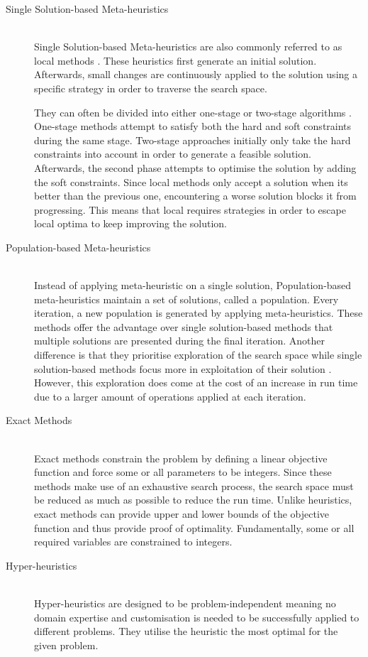 \begin{description}
\item [Single Solution-based Meta-heuristics] \hfill \\
Single Solution-based Meta-heuristics are also commonly referred to as \acrfull{local} methods \cite{lin1973}. These heuristics first generate an initial solution. Afterwards, small changes are continuously applied to the solution using a specific strategy in order to traverse the search space. 

They can often be divided into either one-stage or two-stage algorithms \cite{lewis2008}. One-stage methods attempt to satisfy both the hard and soft constraints during the same stage. Two-stage approaches initially only take the hard constraints into account in order to generate a feasible solution. Afterwards, the second phase attempts to optimise the solution by adding the soft constraints. Since \acrshort{local} methods only accept a solution when its better than the previous one, encountering a worse solution blocks it from progressing. This means that \acrshort{local} requires strategies in order to escape local optima to keep improving the solution. 



\item [Population-based Meta-heuristics] \hfill \\
Instead of applying meta-heuristic on a single solution, Population-based meta-heuristics maintain a set of solutions, called a population. Every iteration, a new population is generated by applying meta-heuristics. These methods offer the advantage over single solution-based methods that multiple solutions are presented during the final iteration. Another difference is that they prioritise exploration of the search space while single solution-based methods focus more in exploitation of their solution  \cite{kohshori2012}. However, this exploration does come at the cost of an increase in run time due to a larger amount of operations applied at each iteration.

\item [Exact Methods]  \hfill \\
Exact methods constrain the problem by defining a linear objective function and force some or all parameters to be integers. Since these methods make use of an exhaustive search process, the search space must be reduced as much as possible to reduce the run time. Unlike heuristics, exact methods can provide upper and lower bounds of the objective function and thus provide proof of optimality. Fundamentally, some or all required variables are constrained to integers. 

\item [Hyper-heuristics] \hfill \\
Hyper-heuristics\cite{cowling2001, burke2013} are designed to be problem-independent meaning no domain expertise and customisation is needed to be successfully applied to different problems. They utilise the heuristic the most optimal for the given problem.

\end{description}


